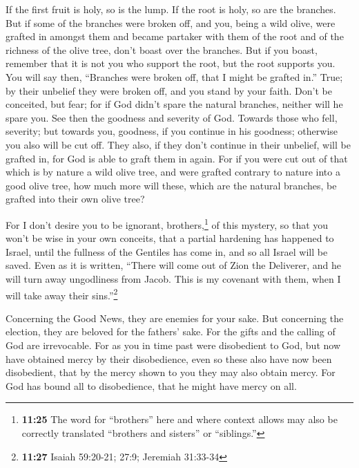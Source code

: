  If the first fruit is holy, so is the lump. If the root
is holy, so are the branches.  But if some of the
branches were broken off, and you, being a wild olive, were grafted in
amongst them and became partaker with them of the root and of the
richness of the olive tree,  don't boast over the
branches. But if you boast, remember that it is not you who support the
root, but the root supports you.  You will say then,
``Branches were broken off, that I might be grafted in.''
 True; by their unbelief they were broken off, and you
stand by your faith. Don't be conceited, but fear;  for
if God didn't spare the natural branches, neither will he spare you.
 See then the goodness and severity of God. Towards those
who fell, severity; but towards you, goodness, if you continue in his
goodness; otherwise you also will be cut off.  They also,
if they don't continue in their unbelief, will be grafted in, for God is
able to graft them in again.  For if you were cut out of
that which is by nature a wild olive tree, and were grafted contrary to
nature into a good olive tree, how much more will these, which are the
natural branches, be grafted into their own olive tree?

 For I don't desire you to be ignorant,
brothers,\footnote{\textbf{11:25} The word for ``brothers'' here and
  where context allows may also be correctly translated ``brothers and
  sisters'' or ``siblings.''} of this mystery, so that you won't be wise
in your own conceits, that a partial hardening has happened to Israel,
until the fullness of the Gentiles has come in,  and so
all Israel will be saved. Even as it is written, ``There will come out
of Zion the Deliverer, and he will turn away ungodliness from Jacob.
 This is my covenant with them, when I will take away
their sins.''\footnote{\textbf{11:27} Isaiah 59:20-21; 27:9; Jeremiah
  31:33-34}

 Concerning the Good News, they are enemies for your
sake. But concerning the election, they are beloved for the fathers'
sake.  For the gifts and the calling of God are
irrevocable.  For as you in time past were disobedient to
God, but now have obtained mercy by their disobedience, 
even so these also have now been disobedient, that by the mercy shown to
you they may also obtain mercy.  For God has bound all to
disobedience, that he might have mercy on all.

